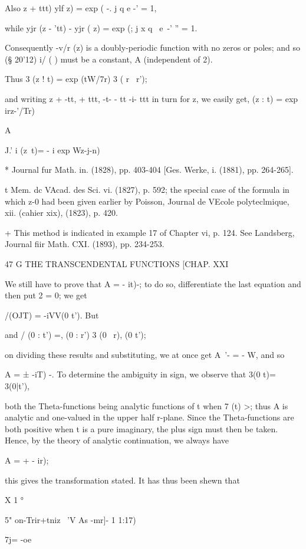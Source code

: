 Also z + ttt) ylf z) = exp ( -. j q e -' = 1,

while yjr (z - 'tt) - yjr ( z) = exp (; j x q~ e~-' '' = 1.

Consequently -v/r (z) is a doubly-periodic function with no zeros or
poles; and so (§ 20'12) i/ ( ) must be a constant, A (independent of
2).

Thus 3 (z ! t) = exp (tW/7r) 3 ( r \ r');

and writing z + -tt, + ttt, -t- - tt -i- ttt in turn for z, we easily
get, (z : t) = exp irz-'/Tr) %

A%

J.' i (z\ t)= - i exp Wz-j-n) %

* Journal fur Math. in. (1828), pp. 403-404 [Ges. Werke, i. (1881),
pp. 264-265].

t Mem. dc VAcad. des Sci. vi. (1827), p. 592; the special case of the
formula in which z-0 had been given earlier by Poisson, Journal de
VEcole polyteclmique, xii. (cahier xix), (1823), p. 420.

+ This method is indicated in example 17 of Chapter vi, p. 124. See
Landsberg, Journal fiir Math. CXI. (1893), pp. 234-253.

47 G THE TRANSCENDENTAL FUNCTIONS [CHAP. XXI

We still have to prove that A = - it)-; to do so, differentiate the
last equation and then put 2 = 0; we get

 /(OJT) = -iVV(0 t'). But %

and / (0 : t') =, (0 : r') 3 (0 \ r), (0 t');

on dividing these results and substituting, we at once get A~'- = - W,
and so

A = ± -iT) -. To determine the ambiguity in sign, we observe that 3(0
t)= 3(0|t'),

both the Theta-functions being analytic functions of t when 7 (t) >;
thus A is analytic and one-valued in the upper half r-plane. Since the
Theta-functions are both positive when t is a pure imaginary, the plus
sign must then be taken. Hence, by the theory of analytic
continuation, we always have

A = + - ir);

this gives the transformation stated. It has thus been shewn that

X 1 °

5" on-Trir+tniz \ 'V As -mr]- 1 1:17)

7j= -oe

